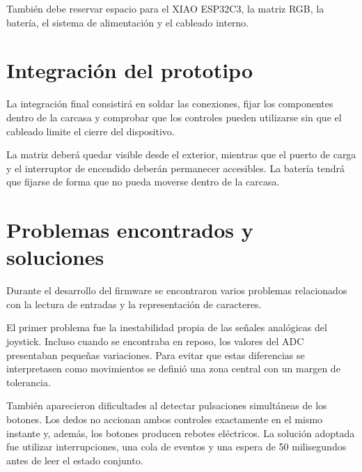 También debe reservar espacio para el XIAO ESP32C3, la matriz RGB, la batería, el sistema de alimentación y el cableado interno.


\section{Integración del prototipo}
\label{sec:integracion-prototipo}

La integración final consistirá en soldar las conexiones, fijar los componentes dentro de la carcasa y comprobar que los controles pueden utilizarse sin que el cableado limite el cierre del dispositivo.

La matriz deberá quedar visible desde el exterior, mientras que el puerto de carga y el interruptor de encendido deberán permanecer accesibles. La batería tendrá que fijarse de forma que no pueda moverse dentro de la carcasa.


\section{Problemas encontrados y soluciones}
\label{sec:problemas-soluciones}

Durante el desarrollo del firmware se encontraron varios problemas relacionados con la lectura de entradas y la representación de caracteres.

El primer problema fue la inestabilidad propia de las señales analógicas del joystick. Incluso cuando se encontraba en reposo, los valores del ADC presentaban pequeñas variaciones. Para evitar que estas diferencias se interpretasen como movimientos se definió una zona central con un margen de tolerancia.

También aparecieron dificultades al detectar pulsaciones simultáneas de los botones. Los dedos no accionan ambos controles exactamente en el mismo instante y, además, los botones producen rebotes eléctricos. La solución adoptada fue utilizar interrupciones, una cola de eventos y una espera de 50 milisegundos antes de leer el estado conjunto.

